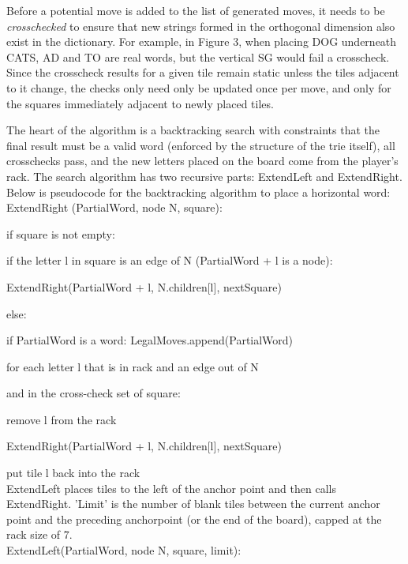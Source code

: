 \documentclass[12pt]{article}
\begin{document}
Before a potential move is added to the list of generated moves, it
needs to be \emph{crosschecked} to ensure that new strings formed in
the orthogonal dimension also exist in the dictionary. For example, in
Figure 3, when placing DOG underneath CATS, AD and TO are real words,
but the vertical SG would fail a crosscheck.  Since the crosscheck
results for a given tile remain static unless the tiles adjacent to it
change, the checks only need only be updated once per move, and only for the
squares immediately adjacent to newly placed tiles.

The heart of the algorithm is a backtracking search with constraints
that the final result must be a valid word (enforced by the structure
of the trie itself), all crosschecks pass, and the new letters placed
on the board come from the player's rack. The search algorithm has two
recursive parts: ExtendLeft and ExtendRight. Below is pseudocode for
the backtracking algorithm to place a horizontal word:\\

\quad ExtendRight (PartialWord, node N, square):

\quad\quad if square is not empty:

\quad\quad\quad if the letter l in square is an edge of N (PartialWord + l is a node):

\quad\quad\quad\quad ExtendRight(PartialWord + l, N.children[l], nextSquare)

\quad\quad else:

\quad\quad\quad if PartialWord is a word: LegalMoves.append(PartialWord)

\quad\quad\quad for each letter l that is in rack and an edge out of N

\quad\quad\quad\quad\quad\quad\quad\quad and in the cross-check set of square:

\quad\quad\quad\quad\quad remove l from the rack

\quad\quad\quad\quad\quad ExtendRight(PartialWord + l, N.children[l], nextSquare)

\quad\quad\quad\quad\quad put tile l back into the rack\\


ExtendLeft places tiles to the left of the anchor point and then calls
ExtendRight. 'Limit' is the number of blank tiles
between the current anchor point and the preceding anchorpoint (or the end of the board), capped at the rack size of 7.\\

\quad ExtendLeft(PartialWord, node N, square, limit):
\end{document}
